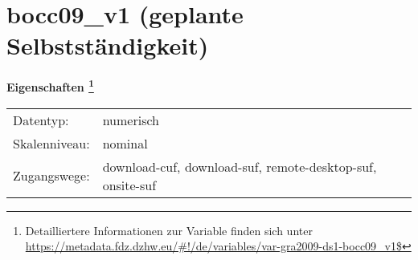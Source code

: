 
    \setcounter{footnote}{0}

    \vspace*{-1.8cm}
	\section{bocc09\_v1 (geplante Selbstständigkeit)}
	\label{section:bocc09_v1}



    \vspace*{0.5cm}
    \noindent\textbf{Eigenschaften
	\footnote{Detailliertere Informationen zur Variable finden sich unter
		\url{https://metadata.fdz.dzhw.eu/\#!/de/variables/var-gra2009-ds1-bocc09_v1$}}}\\
	\begin{tabularx}{\hsize}{@{}lX}
	Datentyp: & numerisch \\
	Skalenniveau: & nominal \\
	Zugangswege: &
	  download-cuf, 
	  download-suf, 
	  remote-desktop-suf, 
	  onsite-suf
 \\
    \end{tabularx}



